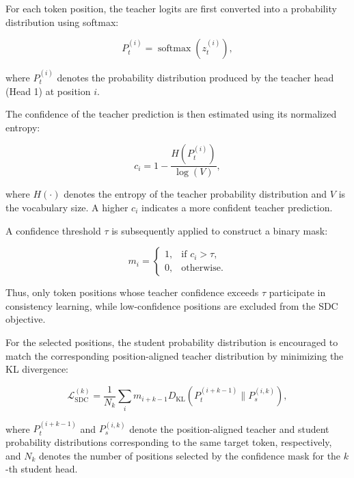 For each token position, the teacher logits are first converted into a probability distribution using softmax:

\begin{equation}
    P_{t}^{(i)}=\operatorname{softmax}\left(z_{t}^{(i)}\right),
\end{equation}

where $P_{t}^{(i)}$ denotes the probability distribution produced by the teacher head (Head 1) at position $i$.

The confidence of the teacher prediction is then estimated using its normalized entropy:

\begin{equation}
    c_{i}=1-\frac{H\left(P_{t}^{(i)}\right)}{\log(V)},
\end{equation}

where $H(\cdot)$ denotes the entropy of the teacher probability distribution and $V$ is the vocabulary size. A higher $c_{i}$ indicates a more confident teacher prediction.

A confidence threshold $\tau$ is subsequently applied to construct a binary mask:

\begin{equation}
    m_{i}=\begin{cases}
                    1, & \text{if } c_{i} > \tau, \\
                    0, & \text{otherwise}.
                \end{cases}
\end{equation}

Thus, only token positions whose teacher confidence exceeds $\tau$ participate in consistency learning, while low-confidence positions are excluded from the SDC objective.

For the selected positions, the student probability distribution is encouraged to match the corresponding position-aligned teacher distribution by minimizing the KL divergence:

\begin{equation}
    \mathcal{L}_{\mathrm{SDC}}^{(k)}=\frac{1}{N_k}\sum_{i}m_{i+k-1}D_{\mathrm{KL}}\left(P_{t}^{(i+k-1)} \parallel P_{s}^{(i,k)}\right),
\end{equation}

where $P_{t}^{(i+k-1)}$ and $P_{s}^{(i,k)}$ denote the position-aligned teacher and student probability distributions corresponding to the same target token, respectively, and $N_k$ denotes the number of positions selected by the confidence mask for the $k$-th student head.

